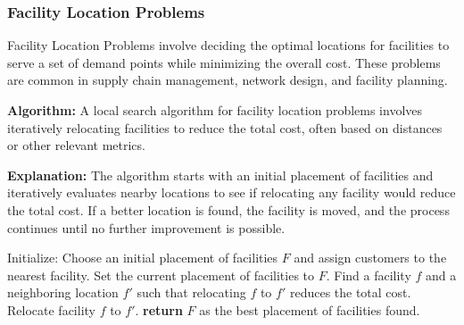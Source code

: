 \documentclass[12pt]{book} %
\begin{document}
\subsubsection{Facility Location Problems}

Facility Location Problems involve deciding the optimal locations for facilities to serve a set of demand points while minimizing the overall cost. These problems are common in supply chain management, network design, and facility planning.

\textbf{Algorithm:} A local search algorithm for facility location problems involves iteratively relocating facilities to reduce the total cost, often based on distances or other relevant metrics.

\textbf{Explanation:} The algorithm starts with an initial placement of facilities and iteratively evaluates nearby locations to see if relocating any facility would reduce the total cost. If a better location is found, the facility is moved, and the process continues until no further improvement is possible.
\FloatBarrier
\begin{algorithm}[H]
\caption{Local Search Algorithm for Facility Location Problems}
\begin{algorithmic}[1]
\State Initialize: Choose an initial placement of facilities \(F\) and assign customers to the nearest facility.
\State Set the current placement of facilities to \(F\).
    \State Find a facility \(f\) and a neighboring location \(f'\) such that relocating \(f\) to \(f'\) reduces the total cost.
        \State Relocate facility \(f\) to \(f'\).
    \EndIf
\EndWhile
\State \textbf{return} \(F\) as the best placement of facilities found.
\end{algorithmic}
\end{algorithm}
\FloatBarrier
\end{document}
